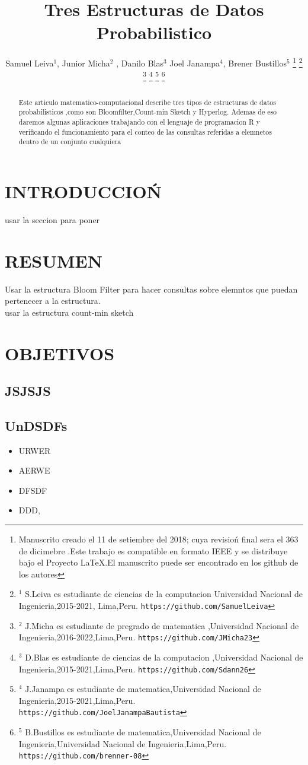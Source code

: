 \documentclass[letterpaper, 10 pt, conference]{ieeeconf}
\title{\LARGE \bf Tres Estructuras de Datos Probabilistico
}
\author{Samuel Leiva$^{1}$, Junior Micha$^{2}$ , Danilo Blas$^{3}$ Joel Janampa$^{4}$, Brener Bustillos$^{5}$%
\thanks{Manuscrito creado el 11 de setiembre del 2018; cuya revisio\'n final sera el 363 de dicimebre .Este trabajo es compatible en formato IEEE y se distribuye bajo el Proyecto LaTeX.El manuscrito puede ser encontrado en los github de los autores}%
\thanks{$^{1}$ S.Leiva es estudiante de ciencias de la computacion 
        Universidad Nacional de Ingenieria,2015-2021, Lima,Peru.
        {\tt\small https://github.com/SamuelLeiva}}%
\thanks{$^{2}$ J.Micha es estudiante de pregrado de matematica ,Universidad Nacional de Ingenieria,2016-2022,Lima,Peru.
        {\tt\small https://github.com/JMicha23}}%
\thanks{$^{3}$ D.Blas es estudiante de ciencias de la computacion ,Universidad Nacional de Ingenieria,2015-2021,Lima,Peru.
        {\tt\small https://github.com/Sdann26}}%
\thanks{$^{4}$ J.Janampa es estudiante de matematica,Universidad Nacional de Ingenieria,2015-2021,Lima,Peru.
        {\tt\small https://github.com/JoelJanampaBautista}}%
\thanks{$^{5}$ B.Bustillos es estudiante de matematica,Universidad Nacional de Ingenieria,Universidad Nacional de Ingenieria,Lima,Peru. 
        {\tt\small https://github.com/brenner-08}}%
}
\begin{document}
\maketitle
\thispagestyle{empty}
\pagestyle{empty}


\begin{abstract}
    

Este articulo matematico-computacional describe tres tipos de estructuras de datos probabilisticos ,como son Bloomﬁlter,Count-min Sketch y Hyperlog. Ademas de eso daremos algunas aplicaciones trabajando con el lenguaje de programacion R y veriﬁcando el funcionamiento para el conteo de las consultas referidas a elemnetos dentro de un conjunto cualquiera

\end{abstract}


\section{INTRODUCCIO\'N}

usar la seccion para poner 

\section{RESUMEN}
Usar la estructura Bloom Filter para hacer consultas sobre elemntos que puedan pertenecer a la estructura.\\
usar la estructura count-min sketch 

\section{OBJETIVOS}


\subsection{JSJSJS}

\subsection{UnDSDFs}

\begin{itemize}

\item URWER 
\item AERWE
\item DFSDF
\item DDD, 

\end{itemize}
\end{document}
